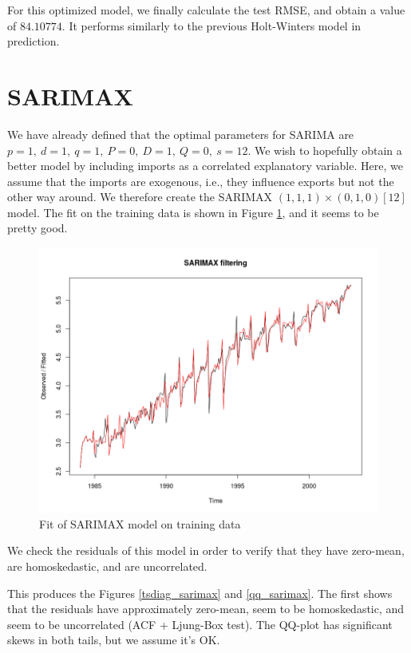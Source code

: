 \documentclass[]{article}
\begin{document}
For this optimized model, we finally calculate the test RMSE, and obtain a value of $84.10774$. It performs similarly to the previous Holt-Winters model in prediction.

\newpage
\section{SARIMAX}
We have already defined that the optimal parameters for SARIMA are $p=1,\ d=1,\ q=1,\ P=0,\ D=1,\ Q=0,\ s=12$. We wish to hopefully obtain a better model by including imports as a correlated explanatory variable. Here, we assume that the imports are exogenous, i.e., they influence exports but not the other way around. We therefore create the SARIMAX $(1,1,1)\times(0,1,0)[12]$ model. The fit on the training data is shown in Figure \ref{fit_sarimax}, and it seems to be pretty good.

\begin{figure}[!ht]
\centering
\includegraphics[width=.8\textwidth]{fit_sarimax}
\caption{Fit of SARIMAX model on training data}
\label{fit_sarimax}
\end{figure}

We check the residuals of this model in order to verify that they have zero-mean, are homoskedastic, and are uncorrelated.

This produces the Figures \ref{tsdiag_sarimax} and \ref{qq_sarimax}. The first shows that the residuals have approximately zero-mean, seem to be homoskedastic, and seem to be uncorrelated (ACF + Ljung-Box test). The QQ-plot has significant skews in both tails, but we assume it's OK.
\end{document}
